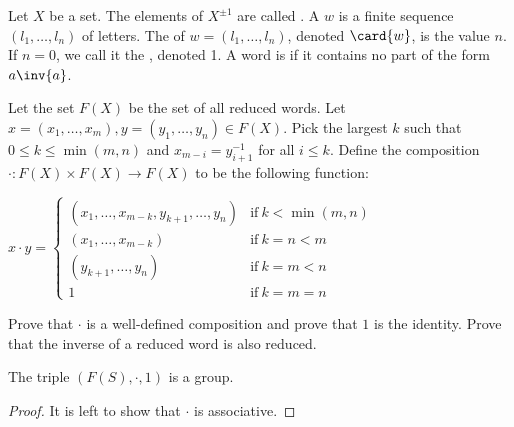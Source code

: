 \documentclass[10pt]{article}
\begin{document}
\begin{definition}
    Let $X$ be a set. The elements of ${X}^{\pm 1}$ are called . A  $w$ is a finite sequence $({l}_{1},\dots,{l}_{n})$ of letters. The  of $w=({l}_{1},\dots,{l}_{n})$, denoted $\card{w}$, is the value $n$. If $n=0$, we call it the , denoted 1. A word is  if it contains no part of the form $a\inv{a}$.
\end{definition}
\par
Let the set $F(X)$ be the set of all reduced words. Let $x=({x}_{1},\dots,{x}_{m}),y=({y}_{1},\dots,{y}_{n})\in F(X)$. Pick the largest $k$ such that $0\le k\le\min(m,n)$ and ${x}_{m-i}={y}_{i+1}^{-1}$ for all $i\le k$. Define the composition $\cdot:F(X)\times F(X)\to F(X)$ to be the following function:
\begin{center}
    $x\cdot y=\begin{cases}
        ({x}_{1},\dots,{x}_{m-k},{y}_{k+1},\dots,{y}_{n}) & \text{if}\ k<\min(m,n) \\
        ({x}_{1},\dots,{x}_{m-k}) & \text{if}\ k=n<m \\
        ({y}_{k+1},\dots,{y}_{n}) & \text{if}\ k=m<n \\
        1 & \text{if}\ k=m=n
    \end{cases}$
\end{center}
\begin{problem}
    Prove that $\cdot$ is a well-defined composition and prove that $1$ is the identity. Prove that the inverse of a reduced word is also reduced.
\end{problem}
\begin{proposition}
    The triple $(F(S),\cdot,1)$ is a group.
\end{proposition}
\begin{proof}
    It is left to show that $\cdot$ is associative. 
\end{proof}
\end{document}
